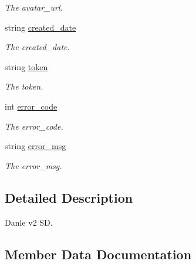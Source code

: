 \begin{DoxyCompactItemize}
\begin{DoxyCompactList}\small\item\em The avatar\+\_\+url. \end{DoxyCompactList}\item 
string \mbox{\hyperlink{class_t_net_1_1_sns_1_1_danle_v2_s_d_k_ac6259a559390343c2721305e9d8ab06a}{created\+\_\+date}}
\begin{DoxyCompactList}\small\item\em The created\+\_\+date. \end{DoxyCompactList}\item 
string \mbox{\hyperlink{class_t_net_1_1_sns_1_1_danle_v2_s_d_k_a65551ee9b279ce76fe6c654b22f360cd}{token}}
\begin{DoxyCompactList}\small\item\em The token. \end{DoxyCompactList}\item 
int \mbox{\hyperlink{class_t_net_1_1_sns_1_1_danle_v2_s_d_k_a9568220d3ea1d365732d955acea2d760}{error\+\_\+code}}
\begin{DoxyCompactList}\small\item\em The error\+\_\+code. \end{DoxyCompactList}\item 
string \mbox{\hyperlink{class_t_net_1_1_sns_1_1_danle_v2_s_d_k_ae86d74b324622001cf08040c711370c5}{error\+\_\+msg}}
\begin{DoxyCompactList}\small\item\em The error\+\_\+msg. \end{DoxyCompactList}\end{DoxyCompactItemize}


\subsection{Detailed Description}
Danle v2 SD. 



\subsection{Member Data Documentation}
\mbox{\label{class_t_net_1_1_sns_1_1_danle_v2_s_d_k_a06ab9d2c6ac4651f38ed40dcb8261f2d}} 
